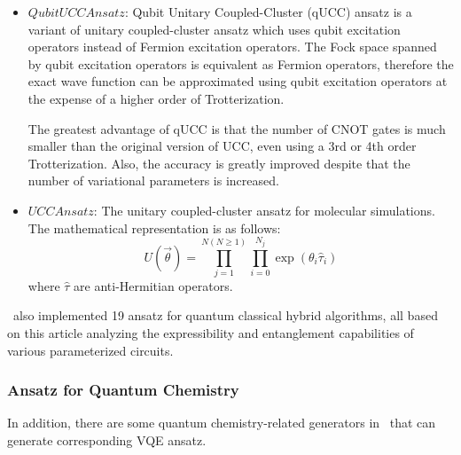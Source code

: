 \begin{itemize}
    \item $QubitUCCAnsatz$: Qubit Unitary Coupled-Cluster (qUCC) ansatz is a variant of unitary coupled-cluster ansatz which uses qubit excitation operators instead of Fermion excitation operators\cite{PhysRevA.102.062612}. The Fock space spanned by qubit excitation operators is equivalent as Fermion operators, therefore the exact wave function can be approximated using qubit excitation operators at the expense of a higher order of Trotterization.

          The greatest advantage of qUCC is that the number of CNOT gates is much smaller than the original version of UCC, even using a 3rd or 4th order Trotterization. Also, the accuracy is greatly improved despite that the number of variational parameters is increased.

    \item $UCCAnsatz$: The unitary coupled-cluster ansatz for molecular simulations. The mathematical representation is as follows:
          $$U(\vec{\theta}) = \prod_{j=1}^{N(N\ge1)}{\prod_{i=0}^{N_{j}}{\exp{(\theta_{i}\hat{\tau}_{i})}}}$$
          where $\hat{\tau}$ are anti-Hermitian operators.
\end{itemize}

\MindQuantum \ also implemented 19 ansatz for quantum classical hybrid algorithms, all based on this article analyzing the expressibility and entanglement capabilities of various parameterized circuits\cite{Sim_2019}.

\subsubsection{Ansatz for Quantum Chemistry}

In addition, there are some quantum chemistry-related generators in \MindQuantum \ that can generate corresponding VQE ansatz.

